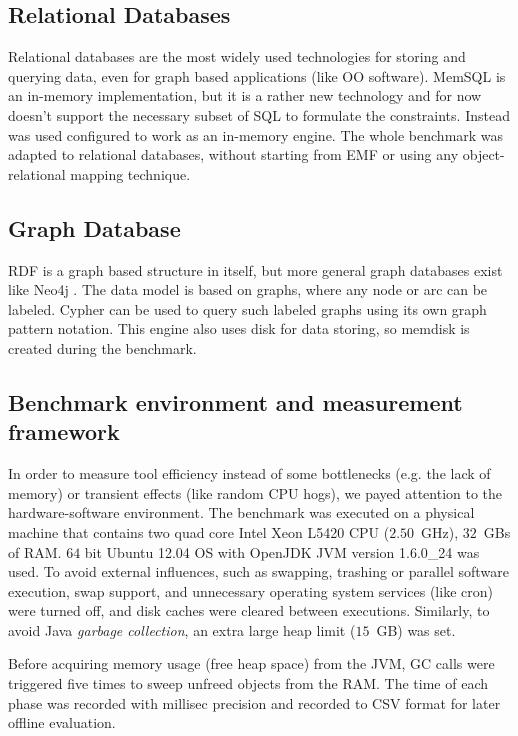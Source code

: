 \subsection{Relational Databases}
Relational databases are the most widely used technologies for storing and
querying data, even for graph based applications (like OO software). MemSQL is
an in-memory implementation, but it is a rather new technology and for now
doesn't support the necessary subset of SQL to formulate the constraints.
Instead  \cite{mysql} was used configured to work as an in-memory
engine. The whole benchmark was adapted to relational databases, without
starting from EMF or using any object-relational mapping technique.

\subsection{Graph Database}
RDF is a graph based structure in itself, but more general graph databases exist
like Neo4j \cite{neo4j}. The data model is based on graphs, where any node or
arc can be labeled. Cypher can be used to query such labeled graphs using its
own graph pattern notation. This engine also uses disk for data storing, so
memdisk is created during the benchmark.

\subsection{Benchmark environment and measurement framework}

In order to measure tool efficiency instead of some bottlenecks (e.g. the lack
of memory) or transient effects (like random CPU hogs), we payed attention to
the hardware-software environment.
The benchmark was executed on a physical machine that contains two quad core
Intel Xeon L5420 CPU ($2.50$~GHz), $32$~GBs of RAM. $64$ bit Ubuntu 12.04 OS
with OpenJDK JVM version 1.6.0\_24 was used. To avoid external influences, such
as swapping, trashing or parallel software execution, swap support, and
unnecessary operating system services (like cron) were turned off, and disk
caches were cleared between executions.
Similarly, to avoid Java \emph{garbage collection}, an extra large heap limit
($15$~GB) was set.

Before acquiring memory usage (free heap space) from the JVM, GC calls were
triggered five times to sweep unfreed objects from the RAM.
The time of each phase was recorded with millisec precision and recorded to CSV
format for later offline evaluation.

